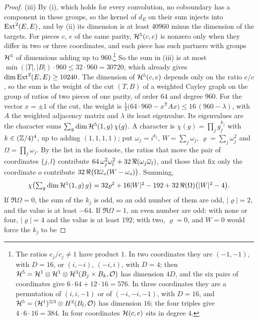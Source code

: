 \begin{proof}
(iii) By (i), which holds for every convolution, no
coboundary has a component in these groups, so the kernel of $d_{E}$ on
their sum injects into $\operatorname{Ext}^{2}(E,E)$, and by (ii) its dimension is at
least $40960$ minus the dimension of the targets. For pieces $c$, $e$ of the
same parity, $\mathcal{H}^{5}(c,e)$ is nonzero only when they differ in two or three
coordinates, and each piece has such partners with groups $\mathcal{H}^{5}$ of
dimensions adding up to $960$.\footnote{The ratios $e_{j}/c_{j}\ne1$ have
product $1$. In two coordinates they are $(-1,-1)$, with $D=16$, or
$(i,-i)$, $(-i,i)$, with $D=4$; then
$\mathcal{H}^{5}=\mathcal{H}^{1}\otimes\mathcal{H}^{1}\otimes\mathcal{H}^{3}(B_{j}\times B_{k},\mathcal{O})$ has
dimension $4D$, and the six pairs of coordinates give
$6\cdot64+12\cdot16=576$. In three coordinates they are a permutation of
$(i,i,-1)$ or of $(-i,-i,-1)$, with $D=16$, and
$\mathcal{H}^{5}=(\mathcal{H}^{1})^{\otimes3}\otimes H^{2}(B_{l},\mathcal{O})$ has dimension $16$;
the four triples give $4\cdot6\cdot16=384$. In four coordinates
$\mathcal{H}(c,e)$ sits in degree $4$.}\enlargethispage{3pt} So the sum in (iii) is at most
$\min(|T|,|B|)\cdot960\le32\cdot960=30720$, which already gives
$\dim\operatorname{Ext}^{2}(E,E)\ge10240$. The dimension of $\mathcal{H}^{5}(c,e)$ depends only on
the ratio $e/c$, so the sum is the weight of the cut $(T,B)$ of a weighted
Cayley graph on the group of ratios of two pieces of one parity, of order
$64$ and degree $960$. For the vector $x=\pm1$ of the cut, the weight is
$\tfrac14\bigl(64\cdot960-x^{\mathsf T}Ax\bigr)\le16\,(960-\lambda)$, with
$A$ the weighted adjacency matrix and $\lambda$ its least eigenvalue. Its
eigenvalues are the character sums $\sum_{g}\dim\mathcal{H}^{5}(1,g)\,\chi(g)$. A
character is $\chi(g)=\prod_{j}g_{j}^{k_{j}}$ with $k\in(\mathbb{Z}/4)^{4}$, up to
adding $(1,1,1,1)$; put $\omega_{j}=i^{k_{j}}$, $W=\sum_{j}\omega_{j}$,
$\varrho=\sum_{j}\omega_{j}^{2}$ and $\Omega=\prod_{j}\omega_{j}$. By the
list in the footnote, the ratios that move the pair of coordinates
$\{j,l\}$ contribute $64\,\omega_{j}^{2}\omega_{l}^{2}
+32\,\Re(\omega_{j}\overline{\omega}_{l})$, and those that fix only the
coordinate $o$ contribute $32\,\Re\bigl(\Omega\overline{\omega}_{o}(W-\omega_{o})\bigr)$.
Summing,
\[
  \chi\bigl(\textstyle\sum_{g}\dim\mathcal{H}^{5}(1,g)\,g\bigr)
  =32\varrho^{2}+16|W|^{2}-192+32\,\Re(\Omega)\bigl(|W|^{2}-4\bigr).
\]
If $\Re\Omega=0$, the sum of the $k_{j}$ is odd, so an odd number of them
are odd, $|\varrho|=2$, and the value is at least $-64$. If $\Re\Omega=1$,
an even number are odd: with none or four, $|\varrho|=4$ and the value is at
least $192$; with two, $\varrho=0$, and $W=0$ would force the $k_{j}$ to be

\end{proof}
